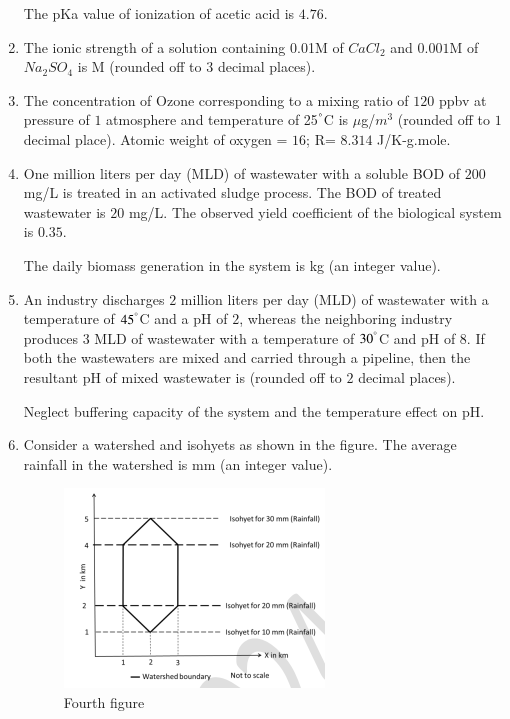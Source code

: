 \documentclass[journal]{IEEEtran}
\numberwithin{equation}{enumi}
\numberwithin{figure}{enumi}
\begin{document}
\begin{enumerate}[start=1, label={Q\arabic*.}]
\vspace{0.1cm}
The pKa value of ionization of acetic acid is $4.76$.

\vspace{0.1cm}
\item The ionic strength of a solution containing 0.01M of $CaCl_2$ and $0.001$M of $Na_2SO_4$ is \underline{\hspace{1.5cm}}M (rounded off to $3$ decimal places).
\newpage
\item The concentration of Ozone corresponding to a mixing ratio of $120$ ppbv at pressure of $1$
atmosphere and temperature of 25$^\degree$C is \underline{\hspace{1.5cm}} $\mu$g/$m^3$
(rounded off to $1$ decimal place).
Atomic weight of oxygen = $16$; R= $8.314$ J/K-g.mole.

\vspace{0.1cm}
\item One million liters per day (MLD) of wastewater with a soluble BOD of $200$ mg/L is
treated in an activated sludge process. The BOD of treated wastewater is $20$ mg/L. The
observed yield coefficient of the biological system is $0.35$.

\vspace{0.1cm}
The daily biomass generation in the system is \underline{\hspace{1.5cm}} kg (an integer value).

\vspace{0.1cm}
\item An industry discharges $2$ million liters per day (MLD) of wastewater with a temperature
of $45^\degree$C and a pH of $2$, whereas the neighboring industry produces $3$ MLD of wastewater
with a temperature of $30^\degree$C and pH of $8$. If both the wastewaters are mixed and carried
through a pipeline, then the resultant pH of mixed wastewater is \underline{\hspace{1.5cm}}(rounded off
to $2$ decimal places).

Neglect buffering capacity of the system and the temperature effect on pH.

\item Consider a watershed and isohyets as shown in the figure. The average rainfall in the
watershed is \underline{\hspace{1.5cm}} mm (an integer value).
\begin{figure}[H]
    \centering
    \includegraphics[width=0.4\linewidth]{figs/fig4.png}
    \caption{Fourth figure}
    \label{fig:fourth}
\end{figure}


\end{enumerate}
\end{document}
